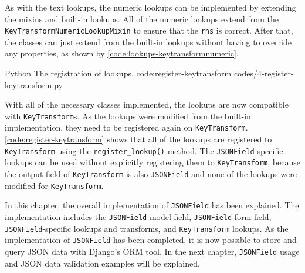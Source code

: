 As with the text lookups, the numeric lookups can be implemented by extending
the mixins and built-in lookups. All of the numeric lookups extend from the
\verb|KeyTransformNumericLookupMixin| to ensure that the \verb|rhs| is correct.
After that, the classes can just extend from the built-in lookups without
having to override any properties, as shown by
\autoref{code:lookups-keytransformnumeric}.

\listing
{Python}
{The registration of  lookups.}
{code:register-keytransform}
{codes/4-register-keytransform.py}

With all of the necessary classes implemented, the lookups are now compatible
with \verb|KeyTransform|s. As the lookups were modified from the built-in
implementation, they need to be registered again on \verb|KeyTransform|.
\autoref{code:register-keytransform} shows that all of the lookups are
registered to \verb|KeyTransform| using the \verb|register_lookup()| method.
The \verb|JSONField|-specific lookups can be used without explicitly
registering them to \verb|KeyTransform|, because the output field of
\verb|KeyTransform| is also \verb|JSONField| and none of the lookups were
modified for \verb|KeyTransform|.

In this chapter, the overall implementation of \verb|JSONField| has been
explained. The implementation includes the \verb|JSONField| model field,
\verb|JSONField| form field, \verb|JSONField|-specific lookups and transforms,
and \verb|KeyTransform| lookups. As the implementation of \verb|JSONField| has
been completed, it is now possible to store and query JSON data with Django's
ORM tool. In the next chapter, \verb|JSONField| usage and JSON data validation
examples will be explained.
